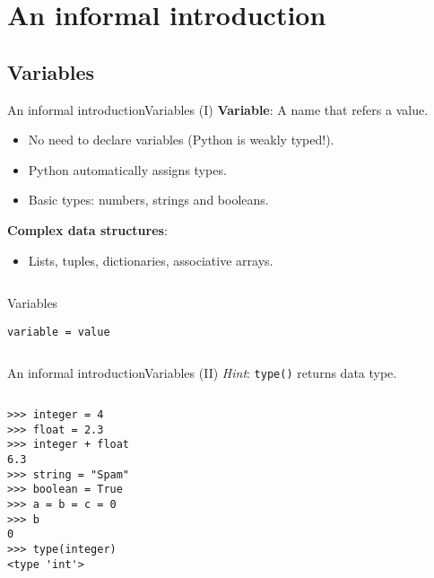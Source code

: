 \documentclass[10pt,compress]{beamer} %
\begin{document}
\section{An informal introduction}

\subsection{Variables}
\begin{frame}[fragile]{An informal introduction}{Variables (I)}
 	\textbf{Variable}: A name that refers a value.
	\begin{itemize}
		\item No need to declare variables (Python is weakly typed!).
		\item Python automatically assigns types.
		\item Basic types: numbers, strings and booleans.
	\end{itemize}
	\textbf{Complex data structures}:
		\begin{itemize}
		\item Lists, tuples, dictionaries, associative arrays.
		\end{itemize}

    \begin{columns}
	\begin{block}{Variables}
	\begin{verbatim}
variable = value
\end{verbatim}
	\end{block}
	\end{columns}
\end{frame}

\begin{frame}[fragile]{An informal introduction}{Variables (II)}
	\centering \textit{Hint}: \texttt{type()} returns data type.

   	\begin{columns}
		\begin{block}{}
		\begin{verbatim}
>>> integer = 4
>>> float = 2.3
>>> integer + float
6.3
>>> string = "Spam"
>>> boolean = True
>>> a = b = c = 0
>>> b
0
>>> type(integer)
<type 'int'>
\end{verbatim}
		\end{block}
	\end{columns}
\end{frame}
\end{document}
